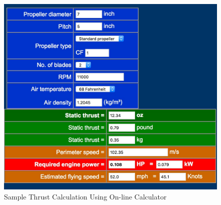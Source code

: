 \documentclass[../main.tex]{subfiles}
\begin{document}
\begin{figure}[H]
	\centering
	\includegraphics[width=1\textwidth]{img/thrust/thrustcalc.jpg}
	\caption{Sample Thrust Calculation Using On-line Calculator \cite{thrustcalc}}
	\label{fig:thrustcalc}
\end{figure}

\pagebreak
\end{document}
